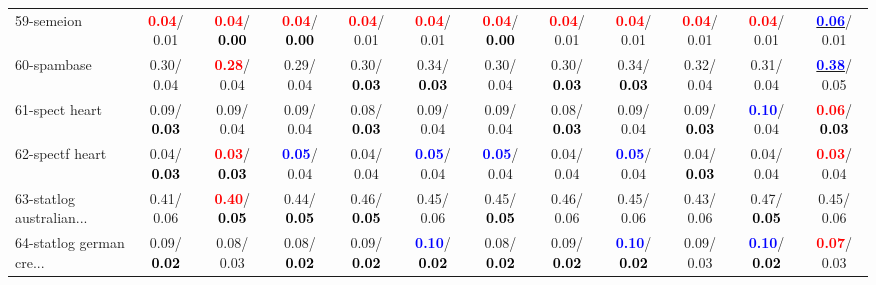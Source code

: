 \begin{table}[h]
\begin{center}
{\begin{tabular}{lc|c|c|c|c|c|c|c|c|c|c}
59-semeion & \textcolor{red}{\textbf{  0.04}}/  0.01 & \textcolor{red}{\textbf{  0.04}}/\textcolor{black}{\textbf{  0.00}} & \textcolor{red}{\textbf{  0.04}}/\textcolor{black}{\textbf{  0.00}} & \textcolor{red}{\textbf{  0.04}}/  0.01 & \textcolor{red}{\textbf{  0.04}}/  0.01 & \textcolor{red}{\textbf{  0.04}}/\textcolor{black}{\textbf{  0.00}} & \textcolor{red}{\textbf{  0.04}}/  0.01 & \textcolor{red}{\textbf{  0.04}}/  0.01 & \textcolor{red}{\textbf{  0.04}}/  0.01 & \textcolor{red}{\textbf{  0.04}}/  0.01 & \underline{\textcolor{blue}{\textbf{  0.06}}}/  0.01 \\
60-spambase &   0.30/  0.04 & \textcolor{red}{\textbf{  0.28}}/  0.04 &   0.29/  0.04 &   0.30/\textcolor{black}{\textbf{  0.03}} &   0.34/\textcolor{black}{\textbf{  0.03}} &   0.30/  0.04 &   0.30/\textcolor{black}{\textbf{  0.03}} &   0.34/\textcolor{black}{\textbf{  0.03}} &   0.32/  0.04 &   0.31/  0.04 & \underline{\textcolor{blue}{\textbf{  0.38}}}/  0.05 \\ \hline
61-spect heart &   0.09/\textcolor{black}{\textbf{  0.03}} &   0.09/  0.04 &   0.09/  0.04 &   0.08/\textcolor{black}{\textbf{  0.03}} &   0.09/  0.04 &   0.09/  0.04 &   0.08/\textcolor{black}{\textbf{  0.03}} &   0.09/  0.04 &   0.09/\textcolor{black}{\textbf{  0.03}} & \textcolor{blue}{\textbf{  0.10}}/  0.04 & \textcolor{red}{\textbf{  0.06}}/\textcolor{black}{\textbf{  0.03}} \\
62-spectf heart &   0.04/\textcolor{black}{\textbf{  0.03}} & \textcolor{red}{\textbf{  0.03}}/\textcolor{black}{\textbf{  0.03}} & \textcolor{blue}{\textbf{  0.05}}/  0.04 &   0.04/  0.04 & \textcolor{blue}{\textbf{  0.05}}/  0.04 & \textcolor{blue}{\textbf{  0.05}}/  0.04 &   0.04/  0.04 & \textcolor{blue}{\textbf{  0.05}}/  0.04 &   0.04/\textcolor{black}{\textbf{  0.03}} &   0.04/  0.04 & \textcolor{red}{\textbf{  0.03}}/  0.04 \\
63-statlog australian... &   0.41/  0.06 & \textcolor{red}{\textbf{  0.40}}/\textcolor{black}{\textbf{  0.05}} &   0.44/\textcolor{black}{\textbf{  0.05}} &   0.46/\textcolor{black}{\textbf{  0.05}} &   0.45/  0.06 &   0.45/\textcolor{black}{\textbf{  0.05}} &   0.46/  0.06 &   0.45/  0.06 &   0.43/  0.06 &   0.47/\textcolor{black}{\textbf{  0.05}} &   0.45/  0.06 \\
64-statlog german cre... &   0.09/\textcolor{black}{\textbf{  0.02}} &   0.08/  0.03 &   0.08/\textcolor{black}{\textbf{  0.02}} &   0.09/\textcolor{black}{\textbf{  0.02}} & \textcolor{blue}{\textbf{  0.10}}/\textcolor{black}{\textbf{  0.02}} &   0.08/\textcolor{black}{\textbf{  0.02}} &   0.09/\textcolor{black}{\textbf{  0.02}} & \textcolor{blue}{\textbf{  0.10}}/\textcolor{black}{\textbf{  0.02}} &   0.09/  0.03 & \textcolor{blue}{\textbf{  0.10}}/\textcolor{black}{\textbf{  0.02}} & \textcolor{red}{\textbf{  0.07}}/  0.03 \\\end{tabular}}\label{stratsALCKappa1aCIELMRedux}
\end{center}
\end{table}
